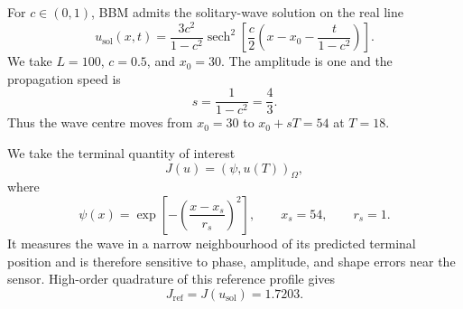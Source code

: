 For $c\in(0,1)$, BBM admits the solitary-wave solution on the real line
\begin{equation}
  u_{\mathrm{sol}}(x,t)
  =\frac{3c^2}{1-c^2}
   \operatorname{sech}^2\!\left[
    \frac c2\left(x-x_0-\frac{t}{1-c^2}\right)
   \right].
  \label{eq:bbm-solitary-wave}
\end{equation}
We take $L=100$, $c=0.5$, and $x_0=30$. The amplitude is one and the propagation speed is
\[
  s=\frac{1}{1-c^2}=\frac43.
\]
Thus the wave centre moves from $x_0=30$ to $x_0+sT=54$ at $T=18$.



We take the terminal quantity of interest
\begin{equation}
  J(u)=(\psi,u(T))_\Omega,
  \label{eq:bbm-qoi}
\end{equation}
where
\begin{equation}
    \psi(x)=\exp\!\left[-\left(\frac{x-x_s}{r_s}\right)^2\right],
  \qquad x_s=54,\qquad r_s=1.
  \label{eq:bbm-sensor}
\end{equation}
It measures the wave in a narrow neighbourhood of its predicted terminal position and is therefore sensitive to phase, amplitude, and shape errors near the sensor. High-order quadrature of this reference profile gives
\begin{equation}
J_{\mathrm{ref}}=J(u_{\mathrm{sol}})=1.7203.
  \label{eq:bbm-reference-goal}
\end{equation}




